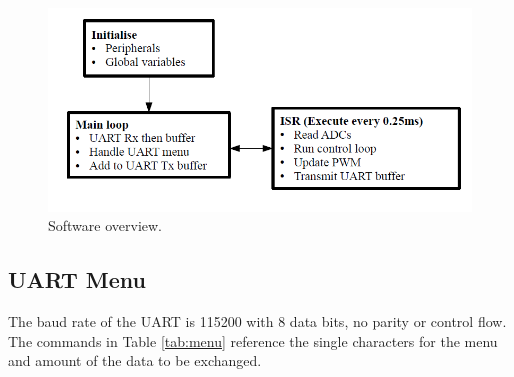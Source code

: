 \documentclass[12pt]{article}%
\begin{document}
\begin{figure}[H]
	\centering
  	\includegraphics[width=12cm]{code.png}
  	\caption{Software overview.}
  	\label{fig:overview}
\end{figure}



\subsection{UART Menu}

The baud rate of the UART is 115200 with 8 data bits, no parity or control flow. The commands in Table \ref{tab:menu} reference the single characters for the menu and amount of the data to be exchanged.
\end{document}

